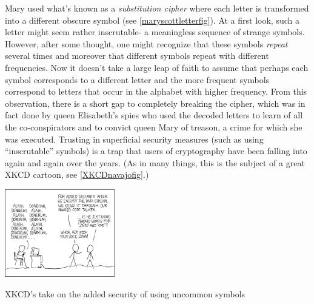 Mary used what's known as a \emph{substitution cipher} where each letter
is transformed into a different obscure symbol (see
\cref{maryscottletterfig}). At a first look, such a letter might seem
rather inscrutable- a meaningless sequence of strange symbols. However,
after some thought, one might recognize that these symbols \emph{repeat}
several times and moreover that different symbols repeat with different
frequencies. Now it doesn't take a large leap of faith to assume that
perhaps each symbol corresponds to a different letter and the more
frequent symbols correspond to letters that occur in the alphabet with
higher frequency. From this observation, there is a short gap to
completely breaking the cipher, which was in fact done by queen
Elisabeth's spies who used the decoded letters to learn of all the
co-conspirators and to convict queen Mary of treason, a crime for which
she was executed. Trusting in superficial security measures (such as
using ``inscrutable'' symbols) is a trap that users of cryptography have
been falling into again and again over the years. (As in many things,
this is the subject of a great XKCD cartoon, see \cref{XKCDnavajofig}.)

\begin{marginfigure}
\centering
\includegraphics[width=\linewidth, height=1.5in, keepaspectratio]{../figure/code_talkers.png}
\caption{XKCD's take on the added security of using uncommon symbols}
\label{XKCDnavajofig}
\end{marginfigure}


